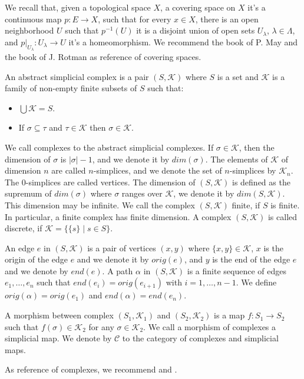 \documentclass{amsart}
\begin{document}
We recall that, given a topological space $X$, a covering space on $X$ it's a continuous map $p\colon E\to X$, such that for every $x\in X$, there is an open neighborhood $U$ such that $p^{-1}(U)$ it is a disjoint union of open sets $U_{\lambda}$, $\lambda\in\Lambda$, and $p|_{U_{\lambda}}\colon U_{\lambda}\to U$ it's a homeomorphism. We recommend the book of P. May \cite{may1999concise} and the book of J. Rotman \cite{rotman2013introduction} as reference of covering spaces.

An abstract simplicial complex is a pair $(S,\mathcal{K})$ where $S$ is a set and $\mathcal{K}$ is a family of non-empty finite subsets of $S$ such that:
\begin{itemize}
\item $\bigcup\mathcal{K}=S$.
\item If $\sigma\subseteq \tau$ and $\tau\in \mathcal{K}$ then $\sigma\in\mathcal{K}$.
\end{itemize}
We call complexes to the abstract simplicial complexes.  If $\sigma\in \mathcal{K}$, then the dimension of $\sigma$ is $\vert\sigma\vert-1$, and we denote it by $dim(\sigma)$. The elements of $\mathcal{K}$ of dimension $n$ are called $n$-simplices, and we denote the set of $n$-simplices by $\mathcal{K}_n$. The $0$-simplices are called vertices. The dimension of $(S,\mathcal{K})$ is defined as the supremum of $dim(\sigma)$ where $\sigma$ ranges over $\mathcal{K}$, we denote it by $dim(S,\mathcal{K})$. This dimension may be infinite. We call the complex $(S,\mathcal{K})$  finite, if $S$ is finite. In particular, a finite complex has finite dimension. A complex $(S,\mathcal{K})$ is called discrete, if $\mathcal{K}=\{\{s\}\mid s\in S\}$.

An edge $e$ in $(S,\mathcal{K})$ is a pair of vertices  $(x,y)$ where $\{x,y\}\in\mathcal{K}$, $x$ is the origin of the edge $e$ and we denote it by $orig(e)$, and $y$ is the end of the edge $e$ and we denote by $end(e)$. A path $\alpha$ in $(S,\mathcal{K})$ is a finite sequence of edges $e_1,\dots,e_n$ such that $end(e_i)=orig(e_{i+1})$ with $i=1,\dots,n-1$. We define $orig(\alpha)=orig(e_1)$ and $end(\alpha)=end(e_n)$.

A morphism between complex $(S_1,\mathcal{K}_1)$ and $(S_2,\mathcal{K}_2)$ is a map $f\colon S_1\longrightarrow S_2$ such that $f(\sigma)\in \mathcal{K}_2$ for any $\sigma\in\mathcal{K}_2$. We call a morphism of complexes a simplicial map. We  denote by $\mathcal{C}$ to the category of complexes and simplicial maps.

As reference of complexes, we recommend \cite{singer2015lecture}  and \cite{spanier1989algebraic}.
\end{document}
